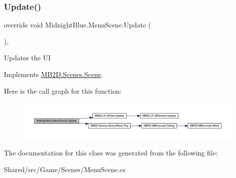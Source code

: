 \hypertarget{class_midnight_blue_1_1_menu_scene_af82ad49ba2744422e52fc6c1b8544255}{}\label{class_midnight_blue_1_1_menu_scene_af82ad49ba2744422e52fc6c1b8544255} 
\subsubsection{\texorpdfstring{Update()}{Update()}}
{\footnotesize\ttfamily override void Midnight\+Blue.\+Menu\+Scene.\+Update (\begin{DoxyParamCaption}{ }\end{DoxyParamCaption})\hspace{0.3cm}{\ttfamily [inline]}, {\ttfamily [virtual]}}



Updates the UI 



Implements \hyperlink{class_m_b2_d_1_1_scenes_1_1_scene_a779de7c1ab23b698dcde3a228324a991}{M\+B2\+D.\+Scenes.\+Scene}.

Here is the call graph for this function\+:
\nopagebreak
\begin{figure}[H]
\begin{center}
\leavevmode
\includegraphics[width=350pt]{class_midnight_blue_1_1_menu_scene_af82ad49ba2744422e52fc6c1b8544255_cgraph}
\end{center}
\end{figure}


The documentation for this class was generated from the following file\+:\begin{DoxyCompactItemize}
\item 
Shared/src/\+Game/\+Scenes/Menu\+Scene.\+cs\end{DoxyCompactItemize}
